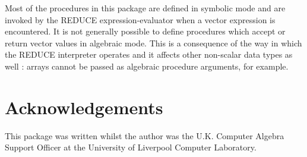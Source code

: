 Most of the procedures in this package are defined in symbolic mode
and are invoked by the REDUCE expression-evaluator when a vector
expression is encountered. It is not generally possible to define
procedures which accept or return vector values in algebraic mode.
This is a consequence of the way in which the REDUCE interpreter
operates and it affects other non-scalar data types as well : arrays
cannot be passed as algebraic procedure arguments, for example.

\section{Acknowledgements}

This package was written whilst the author was the U.K. Computer
Algebra Support Officer at the University of Liverpool Computer Laboratory.


